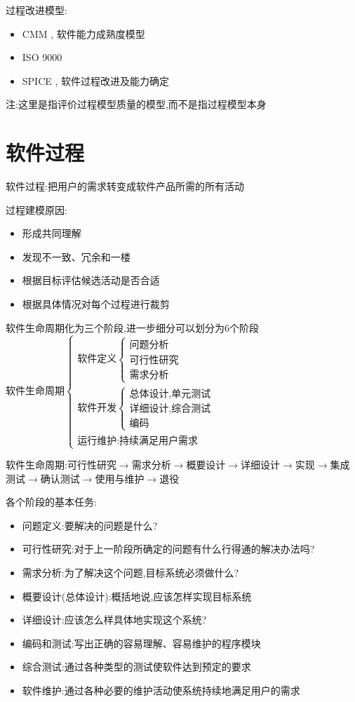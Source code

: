 \documentclass[UTF8,a4paper]{ctexart}
\newcommand{\spaceline}{\vspace{\baselineskip}}
\begin{document}
过程改进模型:
\begin{itemize}
  \item CMM , 软件能力成熟度模型
  \item ISO 9000
  \item SPICE , 软件过程改进及能力确定
\end{itemize}

注:这里是指评价过程模型质量的模型,而不是指过程模型本身

\section{软件过程}
软件过程:把用户的需求转变成软件产品所需的所有活动

过程建模原因:
\begin{itemize}
  \item 形成共同理解
  \item 发现不一致、冗余和一楼
  \item 根据目标评估候选活动是否合适
  \item 根据具体情况对每个过程进行裁剪
\end{itemize}

软件生命周期化为三个阶段,进一步细分可以划分为6个阶段
\spaceline
$\text{软件生命周期}\left \{\begin{array}{l}
\text{软件定义} \left \{\begin{array}{l}
  \text{问题分析}\\
  \text{可行性研究}\\
  \text{需求分析}
\end{array} \right .\\
\text{软件开发} \left \{\begin{array}{l}
  \text{总体设计,单元测试}\\
  \text{详细设计,综合测试}\\
  \text{编码}
\end{array} \right .\\
\text{运行维护:持续满足用户需求}
\end{array} \right .$

软件生命周期:可行性研究$\to$需求分析$\to$概要设计$\to$详细设计$\to$实现$\to$集成测试$\to$确认测试$\to$使用与维护$\to$退役

各个阶段的基本任务:
\begin{itemize}
  \item 问题定义:要解决的问题是什么?
  \item 可行性研究:对于上一阶段所确定的问题有什么行得通的解决办法吗?
  \item 需求分析:为了解决这个问题,目标系统必须做什么?
  \item 概要设计(总体设计):概括地说,应该怎样实现目标系统
  \item 详细设计:应该怎么样具体地实现这个系统?
  \item 编码和测试:写出正确的容易理解、容易维护的程序模块
  \item 综合测试:通过各种类型的测试使软件达到预定的要求
  \item 软件维护:通过各种必要的维护活动使系统持续地满足用户的需求
\end{itemize}
\end{document}
